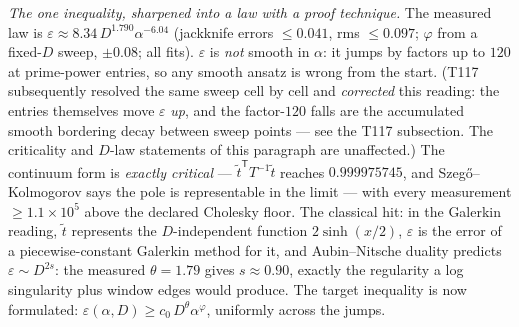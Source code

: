 \documentclass[11pt,a4paper]{article}
\begin{document}
\emph{The one inequality, sharpened into a law with a proof technique.} The measured law is
$\varepsilon\approx8.34\,D^{1.790}\alpha^{-6.04}$ (jackknife errors $\le0.041$, rms $\le0.097$;
$\varphi$ from a fixed-$D$ sweep, $\pm0.08$; all fits). $\varepsilon$ is \emph{not} smooth in
$\alpha$: it jumps by factors up to $120$ at prime-power entries, so any smooth ansatz is wrong
from the start. (T117 subsequently resolved the same sweep cell by cell and \emph{corrected}
this reading: the entries themselves move $\varepsilon$ \emph{up}, and the factor-$120$ falls
are the accumulated smooth bordering decay between sweep points --- see the T117 subsection.
The criticality and $D$-law statements of this paragraph are unaffected.) The continuum form is
\emph{exactly critical} ---
$\tilde t^{\mathsf T}T^{-1}\tilde t$ reaches $0.999975745$, and Szeg\H{o}--Kolmogorov says the
pole is representable in the limit --- with every measurement $\ge1.1\times10^{5}$ above the
declared Cholesky floor. The classical hit: in the Galerkin reading, $\tilde t$ represents the
$D$-independent function $2\sinh(x/2)$, $\varepsilon$ is the error of a piecewise-constant
Galerkin method for it, and Aubin--Nitsche duality predicts $\varepsilon\sim D^{2s}$: the
measured $\theta=1.79$ gives $s\approx0.90$, exactly the regularity a log singularity plus
window edges would produce. The target inequality is now formulated:
$\varepsilon(\alpha,D)\ge c_0\,D^{\theta}\alpha^{\varphi}$, uniformly across the jumps.
\end{document}
